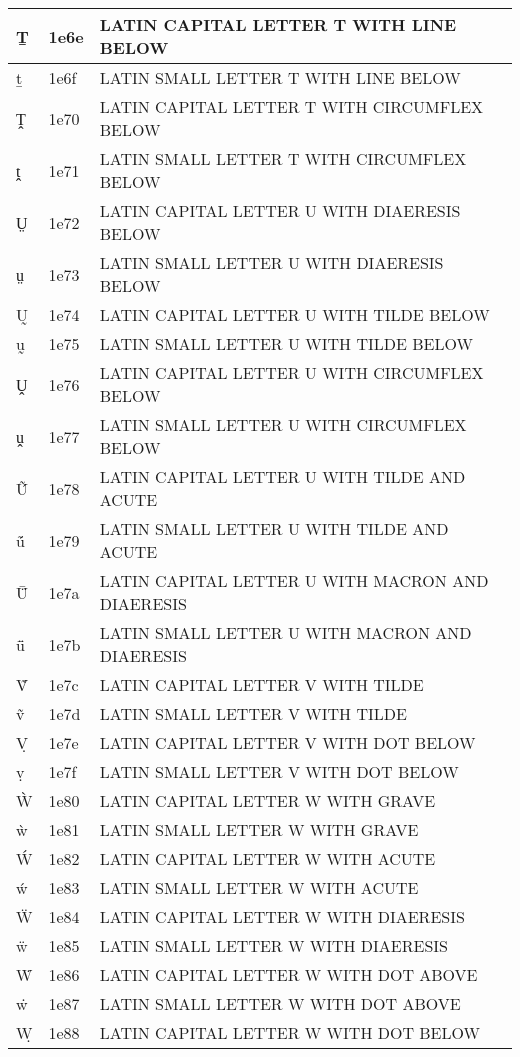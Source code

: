 \documentclass[12pt,letterpaper,openany]{book}
\begin{document}
\begin{center}
\begin{supertabular}{|m{0.25in}|m{0.5in}|m{4in}|}
Ṯ & 1e6e & LATIN CAPITAL LETTER T WITH LINE BELOW\\\hline
ṯ & 1e6f & LATIN SMALL LETTER T WITH LINE BELOW\\\hline
Ṱ & 1e70 & LATIN CAPITAL LETTER T WITH CIRCUMFLEX BELOW\\\hline
ṱ & 1e71 & LATIN SMALL LETTER T WITH CIRCUMFLEX BELOW\\\hline
Ṳ & 1e72 & LATIN CAPITAL LETTER U WITH DIAERESIS BELOW\\\hline
ṳ & 1e73 & LATIN SMALL LETTER U WITH DIAERESIS BELOW\\\hline
Ṵ & 1e74 & LATIN CAPITAL LETTER U WITH TILDE BELOW\\\hline
ṵ & 1e75 & LATIN SMALL LETTER U WITH TILDE BELOW\\\hline
Ṷ & 1e76 & LATIN CAPITAL LETTER U WITH CIRCUMFLEX BELOW\\\hline
ṷ & 1e77 & LATIN SMALL LETTER U WITH CIRCUMFLEX BELOW\\\hline
Ṹ & 1e78 & LATIN CAPITAL LETTER U WITH TILDE AND ACUTE\\\hline
ṹ & 1e79 & LATIN SMALL LETTER U WITH TILDE AND ACUTE\\\hline
Ṻ & 1e7a & LATIN CAPITAL LETTER U WITH MACRON AND DIAERESIS\\\hline
ṻ & 1e7b & LATIN SMALL LETTER U WITH MACRON AND DIAERESIS\\\hline
Ṽ & 1e7c & LATIN CAPITAL LETTER V WITH TILDE\\\hline
ṽ & 1e7d & LATIN SMALL LETTER V WITH TILDE\\\hline
Ṿ & 1e7e & LATIN CAPITAL LETTER V WITH DOT BELOW\\\hline
ṿ & 1e7f & LATIN SMALL LETTER V WITH DOT BELOW\\\hline
Ẁ & 1e80 & LATIN CAPITAL LETTER W WITH GRAVE\\\hline
ẁ & 1e81 & LATIN SMALL LETTER W WITH GRAVE\\\hline
Ẃ & 1e82 & LATIN CAPITAL LETTER W WITH ACUTE\\\hline
ẃ & 1e83 & LATIN SMALL LETTER W WITH ACUTE\\\hline
Ẅ & 1e84 & LATIN CAPITAL LETTER W WITH DIAERESIS\\\hline
ẅ & 1e85 & LATIN SMALL LETTER W WITH DIAERESIS\\\hline
Ẇ & 1e86 & LATIN CAPITAL LETTER W WITH DOT ABOVE\\\hline
ẇ & 1e87 & LATIN SMALL LETTER W WITH DOT ABOVE\\\hline
Ẉ & 1e88 & LATIN CAPITAL LETTER W WITH DOT BELOW\\\hline

\end{supertabular}
\end{center}
\end{document}
